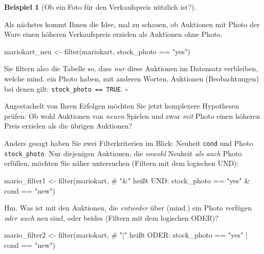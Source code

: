 \documentclass[
  letterpaper,
  oneside,
  open=any]{scrbook}
\newenvironment{Shaded}{\begin{snugshade}}{\end{snugshade}}
\newcommand{\CommentTok}[1]{\textcolor[rgb]{0.37,0.37,0.37}{#1}}
\newcommand{\FunctionTok}[1]{\textcolor[rgb]{0.28,0.35,0.67}{#1}}
\newcommand{\NormalTok}[1]{\textcolor[rgb]{0.00,0.23,0.31}{#1}}
\newcommand{\OtherTok}[1]{\textcolor[rgb]{0.00,0.23,0.31}{#1}}
\newcommand{\SpecialCharTok}[1]{\textcolor[rgb]{0.37,0.37,0.37}{#1}}
\newcommand{\StringTok}[1]{\textcolor[rgb]{0.13,0.47,0.30}{#1}}
\theoremstyle{definition}
\theoremstyle{definition}
\newtheorem{example}{Beispiel}[chapter]
\theoremstyle{definition}
\theoremstyle{remark}
\begin{document}
\begin{example}[Ob ein Foto für den Verkaufspreis nützlich
ist?]\protect\hypertarget{exm-filter}{}\label{exm-filter}

Als nächstes kommt Ihnen die Idee, mal zu schauen, ob Auktionen mit
Photo der Ware einen höheren Verkaufspreis erzielen als Auktionen ohne
Photo.

\begin{Shaded}
\begin{Highlighting}[]
\NormalTok{mariokart\_neu }\OtherTok{\textless{}{-}} \FunctionTok{filter}\NormalTok{(mariokart, stock\_photo }\SpecialCharTok{==} \StringTok{"yes"}\NormalTok{)}
\end{Highlighting}
\end{Shaded}

Sie filtern also die Tabelle so, dass \emph{nur} diese Auktionen im
Datensatz verbleiben, welche mind. ein Photo haben, mit anderen Worten,
Auktionen (Beobachtungen) bei denen gilt:
\texttt{stock\_photo\ ==\ TRUE}. \(\square\)

\end{example}

Angestachelt von Ihren Erfolgen möchten Sie jetzt komplexere Hypothesen
prüfen: Ob wohl Auktionen von \emph{neuen} Spielen und zwar \emph{mit}
Photo einen höheren Preis erzielen als die übrigen Auktionen?

Anders gesagt haben Sie zwei Filterkriterien im Blick: Neuheit
\texttt{cond} und Photo \texttt{stock\_photo}. Nur diejenigen Auktionen,
die \emph{sowohl} Neuheit \emph{als auch} Photo erfüllen, möchten Sie
näher untersuchen (Filtern mit dem logischen UND):

\begin{Shaded}
\begin{Highlighting}[]
\NormalTok{mario\_filter1 }\OtherTok{\textless{}{-}} 
  \FunctionTok{filter}\NormalTok{(mariokart,  }\CommentTok{\# "\&" heißt UND:}
\NormalTok{         stock\_photo }\SpecialCharTok{==} \StringTok{"yes"} \SpecialCharTok{\&}\NormalTok{ cond }\SpecialCharTok{==} \StringTok{"new"}\NormalTok{)}
\end{Highlighting}
\end{Shaded}

Hm. Was ist mit den Auktionen, die \emph{entweder} über (mind.) ein
Photo verfügen \emph{oder auch} neu sind, oder beides (Filtern mit dem
logischen ODER)?

\begin{Shaded}
\begin{Highlighting}[]
\NormalTok{mario\_filter2 }\OtherTok{\textless{}{-}} 
  \FunctionTok{filter}\NormalTok{(mariokart,  }\CommentTok{\# "|" heißt ODER:}
\NormalTok{         stock\_photo }\SpecialCharTok{==} \StringTok{"yes"} \SpecialCharTok{|}\NormalTok{ cond }\SpecialCharTok{==} \StringTok{"new"}\NormalTok{)}
\end{Highlighting}
\end{Shaded}
\end{document}
